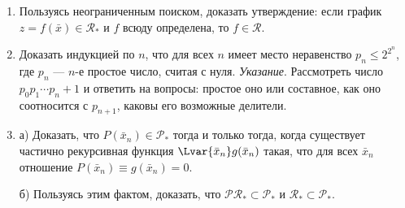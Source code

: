 \documentclass[12pt,a4paper]{article}
\begin{document}
\begin{enumerate}[itemsep=3pt]
\item Пользуясь неограниченным поиском, доказать утверждение: 
если график $z=f(\bar x)\in{\mathcal R_*}$ и $f$ всюду определена, 
то $f\in\mathcal R$.

\item Доказать индукцией по $n$, что для всех $n$ имеет место неравенство $p_n\leqslant 2^{2^n}$,
где $p_n$ --- $n$-е простое число, считая с нуля. 
\emph{Указание}. Рассмотреть число 
$p_0p_1\cdots p_n+1$ и ответить на вопросы: простое оно или составное, 
как оно соотносится с $p_{n+1}$, каковы его возможные делители.


\item а) Доказать, что $P(\bar x_n)\in\mathcal P_*$ тогда и только тогда, когда
существует частично рекурсивная функция $\Lvar{\bar x_n} g(\bar x_n)$ такая, что 
для всех $\bar x_n$ отношение $P(\bar x_n)\equiv g(\bar x_n)=0$. 

б) Пользуясь этим фактом, доказать, что $\mathcal{PR}_*\subset\mathcal P_*$ и 
$\mathcal{R}_*\subset\mathcal P_*$.

\end{enumerate}
\end{document}
